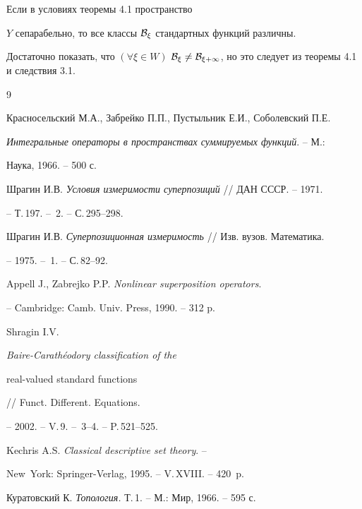 


\begin{cors} 


Если в условиях теоремы 4.1 пространство 


$Y$ сепарабельно, то все классы $\cal B_\xi$ стандартных функций различны. 


\end{cors} 


 


\begin{pf} 


Достаточно показать, что $(\forall \xi\in W)$ $\cal B_\xi\ne\cal 


B_{\xi+1}$, но это следует из теоремы 4.1 и следствия 3.1. 


\end{pf} 


 


 


\begin{thebibliography}{9} 


 




Красносельский М.А., Забрейко П.П., Пустыльник Е.И., Соболевский П.Е. 


{\em Интегральные операторы в пространствах суммируемых функций}. -- М.: 


Наука, 1966. -- 500 с. 




Шрагин И.В. {\em Условия измеримости суперпозиций} // ДАН СССР. -- 1971. 


-- Т.\,197. -- \No\,2. -- С.\,295--298. 




Шрагин И.В. {\em Суперпозиционная измеримость} // Изв. вузов. Математика. 


-- 1975. -- \No\,1. -- С.\,82--92. 




Appell J., Zabrejko P.P. {\em Nonlinear superposition operators}. 


-- Cambridge: Camb. Univ. Press, 1990. -- 312 p. 




Shragin I.V. {\em Baire-Carath\'eodory classification of the 


real-valued standard functions} // Funct. Different. Equations. 


-- 2002. -- V.\,9. -- \No\,3--4. -- P.\,521--525. 




Kechris A.S. {\em Classical descriptive set theory}. -- 


New~York: Springer-Verlag, 1995. -- V.\,XVIII. -- 420~p. 




Куратовский К. {\em Топология.} Т.\,1. -- М.: Мир, 1966. -- 595 с. 


 


\end{thebibliography} 


